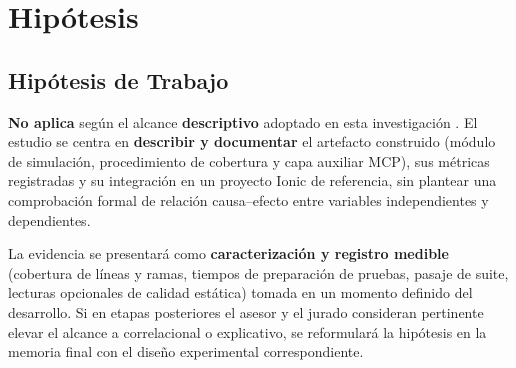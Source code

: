 \section{Hipótesis}
\label{chap:hipotesis}

\subsection{Hipótesis de Trabajo}
\label{sec:hipotesis_trabajo}

\textbf{No aplica} según el alcance \textbf{descriptivo} adoptado en esta investigación \cite{sampieri2023metodologia}. El estudio se centra en \textbf{describir y documentar} el artefacto construido (módulo de simulación, procedimiento de cobertura y capa auxiliar MCP), sus métricas registradas y su integración en un proyecto Ionic de referencia, sin plantear una comprobación formal de relación causa--efecto entre variables independientes y dependientes.

La evidencia se presentará como \textbf{caracterización y registro medible} (cobertura de líneas y ramas, tiempos de preparación de pruebas, pasaje de suite, lecturas opcionales de calidad estática) tomada en un momento definido del desarrollo. Si en etapas posteriores el asesor y el jurado consideran pertinente elevar el alcance a correlacional o explicativo, se reformulará la hipótesis en la memoria final con el diseño experimental correspondiente.
